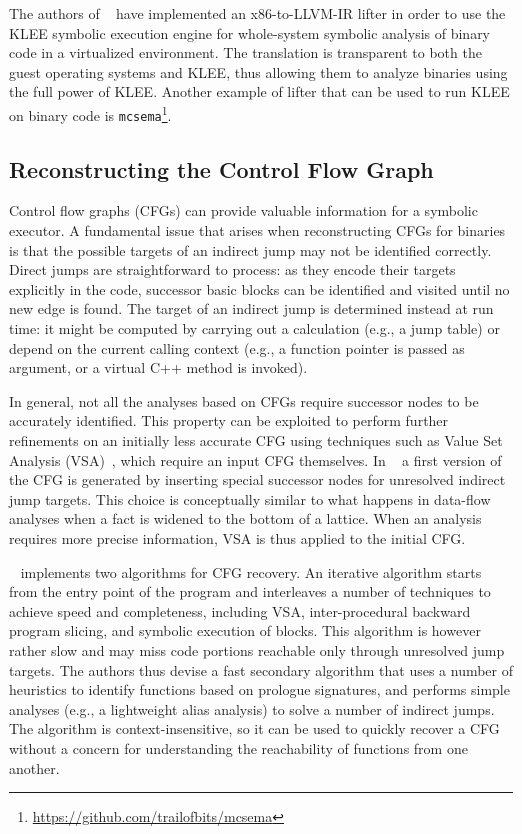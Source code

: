 The authors of ~\cite{CKC-TOCS12} have implemented an x86-to-LLVM-IR lifter in order to use the KLEE symbolic execution engine for whole-system symbolic analysis of binary code in a virtualized environment. The translation is transparent to both the guest operating systems and KLEE, thus allowing them to analyze binaries using the full power of KLEE. Another example of lifter that can be used to run KLEE on binary code is {\tt mcsema}\footnote{\url{https://github.com/trailofbits/mcsema}}.

\subsection{Reconstructing the Control Flow Graph}

Control flow graphs (CFGs) can provide valuable information for a symbolic executor. A fundamental issue that arises when reconstructing CFGs for binaries is that the possible targets of an indirect jump may not be identified correctly. Direct jumps are straightforward to process: as they encode their targets explicitly in the code, successor basic blocks can be identified and visited until no new edge is found. The target of an indirect jump is determined instead at run time: it might be computed by carrying out a calculation (e.g., a jump table) or depend on the current calling context (e.g., a function pointer is passed as argument, or a virtual C++ method is invoked). %

In general, not all the analyses based on CFGs require successor nodes to be accurately identified. This property can be exploited to perform further refinements on an initially less accurate CFG using techniques such as Value Set Analysis (VSA)~\cite{VSA-CC04}, which require an input CFG themselves. In ~\cite{BITBLAZE-ICISS08} a first version of the CFG is generated by inserting special successor nodes for unresolved indirect jump targets. This choice is conceptually similar to what happens in data-flow analyses when a fact is widened to the bottom of a lattice. When an analysis requires more precise information, VSA is thus applied to the initial CFG.

~\cite{ANGR-SP16} implements two algorithms for CFG recovery. An iterative algorithm starts from the entry point of the program and interleaves a number of techniques to achieve speed and completeness, including VSA, inter-procedural backward program slicing, and symbolic execution of blocks. This algorithm is however rather slow and may miss code portions reachable only through unresolved jump targets. The authors thus devise a fast secondary algorithm that uses a number of heuristics to identify functions based on prologue signatures, and performs simple analyses (e.g., a lightweight alias analysis) to solve a number of indirect jumps. The algorithm is context-insensitive, so it can be used to quickly recover a CFG without a concern for understanding the reachability of functions from one another. 

